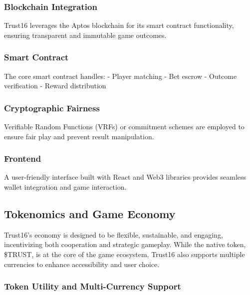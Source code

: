 \documentclass[]{article}
\begin{document}
\hypertarget{blockchain-integration}{%
\subsubsection{Blockchain
Integration}\label{blockchain-integration}}

Trust16 leverages the Aptos blockchain for its smart contract
functionality, ensuring transparent and immutable game outcomes.

\hypertarget{smart-contract}{%
\subsubsection{Smart Contract}\label{smart-contract}}

The core smart contract handles: - Player matching - Bet escrow -
Outcome verification - Reward distribution

\hypertarget{cryptographic-fairness}{%
\subsubsection{Cryptographic
Fairness}\label{cryptographic-fairness}}

Verifiable Random Functions (VRFs) or commitment schemes are employed to
ensure fair play and prevent result manipulation.

\hypertarget{frontend}{%
\subsubsection{Frontend}\label{frontend}}

A user-friendly interface built with React and Web3 libraries provides
seamless wallet integration and game interaction.

\hypertarget{tokenomics-and-game-economy}{%
\subsection{Tokenomics and Game
Economy}\label{tokenomics-and-game-economy}}

Trust16's economy is designed to be flexible, sustainable, and engaging,
incentivizing both cooperation and strategic gameplay. While the native
token, \$TRUST, is at the core of the game ecosystem, Trust16 also
supports multiple currencies to enhance accessibility and user choice.

\hypertarget{token-utility-and-multi-currency-support}{%
\subsubsection{Token Utility and Multi-Currency
Support}\label{token-utility-and-multi-currency-support}}
\end{document}
